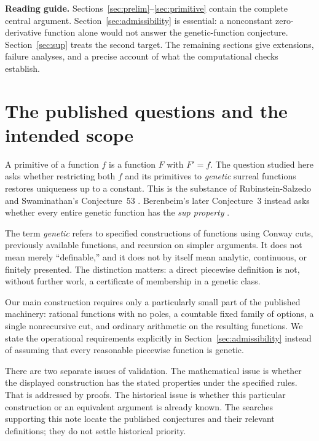 \documentclass[11pt,letterpaper]{article}
\numberwithin{equation}{section}
\theoremstyle{definition}
\theoremstyle{remark}
\newcommand{\source}[2]{\cite[#1]{#2}}
\begin{document}
\newpage
\tableofcontents
\vspace{0.6cm}
\noindent\textbf{Reading guide.}
Sections~\ref{sec:prelim}--\ref{sec:primitive} contain the complete central
argument. Section~\ref{sec:admissibility} is essential: a nonconstant
zero-derivative function alone would not answer the genetic-function
conjecture. Section~\ref{sec:sup} treats the second target.
The remaining sections give extensions, failure analyses, and a precise
account of what the computational checks establish.

\section{The published questions and the intended scope}\label{sec:targets}
A primitive of a function $f$ is a function $F$ with $F'=f$. The question
studied here asks whether restricting both $f$ and its primitives to
\emph{genetic} surreal functions restores uniqueness up to a constant.
This is the substance of Rubinstein-Salzedo and Swaminathan's Conjecture~53
\source{p.~37}{RSS}. Berenbeim's later Conjecture~3 instead asks whether
every entire genetic function has the \emph{sup property}
\source{pp.~225--226}{Berenbeim}.

The term \emph{genetic} refers to specified constructions of functions
using Conway cuts, previously available functions, and recursion on simpler
arguments. It does not mean merely ``definable,'' and it does not by itself
mean analytic, continuous, or finitely presented. The distinction matters:
a direct piecewise definition is not, without further work, a certificate
of membership in a genetic class.

Our main construction requires only a particularly small part of the
published machinery: rational functions with no poles, a countable fixed
family of options, a single nonrecursive cut, and ordinary arithmetic on
the resulting functions. We state the operational requirements explicitly
in Section~\ref{sec:admissibility} instead of assuming that every reasonable
piecewise function is genetic.

There are two separate issues of validation. The mathematical issue is
whether the displayed construction has the stated properties under the
specified rules. That is addressed by proofs. The historical issue is
whether this particular construction or an equivalent argument is already
known. The searches supporting this note locate the published conjectures
and their relevant definitions; they do not settle historical priority.
\end{document}
